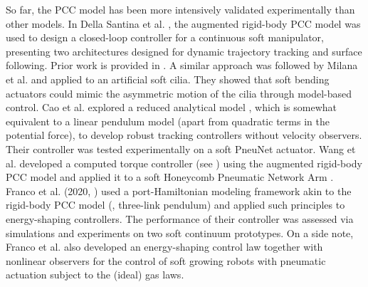 So far, the PCC model has been more intensively validated experimentally than other models. In Della Santina et al. \cite{DellaSantina2020a}, the augmented rigid-body PCC model was used to design a closed-loop controller for a continuous soft manipulator, presenting two architectures designed for dynamic trajectory tracking and surface following. Prior work is provided in \cite{Katzschmann2019}. A similar approach was followed by Milana et al. \cite{Milana2021} and applied to an artificial soft cilia. They showed that soft bending actuators could mimic the asymmetric motion of the cilia through model-based control. Cao et al. \cite{Cao2021Apr} explored a reduced analytical model \cite{Wang2019Apr}, which is somewhat equivalent to a linear pendulum model (apart from quadratic terms in the potential force), to develop robust tracking controllers without velocity observers. Their controller was tested experimentally on a soft PneuNet actuator. Wang et al. \cite{Wang2022Mar} developed a computed torque controller (see \cite{Spong2006}) using the augmented rigid-body PCC model and applied it to a soft Honeycomb Pneumatic Network Arm \cite{Jiang2016Dec}. Franco et al. (2020, \cite{Franco2020,Franco2020Jan}) used a port-Hamiltonian modeling framework akin to the rigid-body PCC model (\ie, three-link pendulum) and applied such principles to energy-shaping controllers. The performance of their controller was assessed via simulations and experiments on two soft continuum prototypes. On a side note, Franco et al. \cite{Franco2022May} also developed an energy-shaping control law together with nonlinear observers for the control of soft growing robots \cite{Hawkes2017} with pneumatic actuation subject to the (ideal) gas laws.

